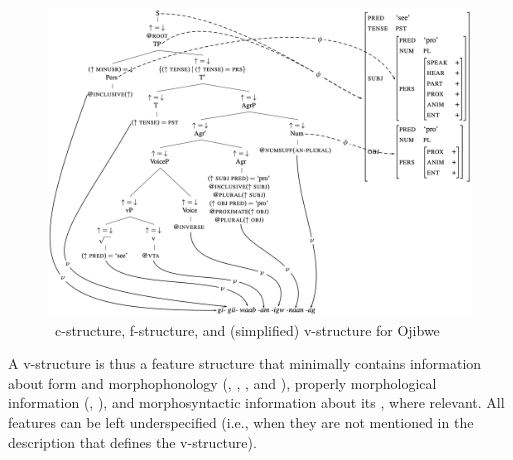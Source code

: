 \documentclass[output=paper,hidelinks]{langscibook}
\begin{document}
\begin{figure}
  \includegraphics[width=\textwidth]{figures/Morphology/ojibwe-cs-fs-vs.png}
  \caption{\lrfg\ c-structure, f-structure, and (simplified)
    v-structure for Ojibwe  }
  \label{fig:objiwe-cs-fs-vs}
\end{figure}
\clearpage


%
A v-structure is thus a feature structure that minimally contains information
about form and morphophonology (, ,
, and ), properly morphological information
(, ), and morphosyntactic information about its
, where relevant. All features can be left underspecified
(i.e., when they are not mentioned in the description that defines the
v-structure). 
\end{document}
